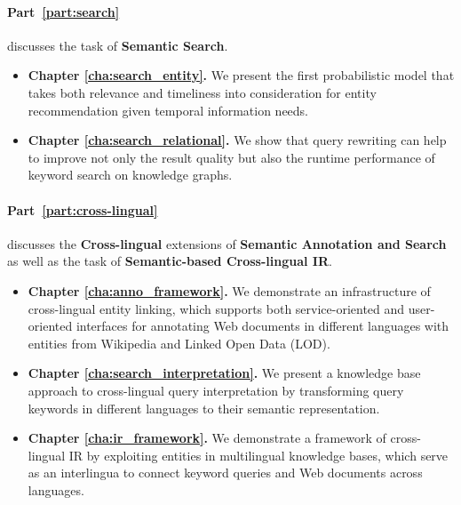 \paragraph{\textbf{Part~\ref{part:search}}} discusses the task of \textbf{Semantic Search}.

\begin{itemize}
\item \textbf{Chapter \ref{cha:search_entity}.} We present the first probabilistic model that takes both relevance and timeliness into consideration for entity recommendation given temporal information needs.
\item \textbf{Chapter \ref{cha:search_relational}.} We show that query rewriting can help to improve not only the result quality but also the runtime performance of keyword search on knowledge graphs.
\end{itemize}

\paragraph{\textbf{Part~\ref{part:cross-lingual}}} discusses the \textbf{Cross-lingual} extensions of \textbf{Semantic Annotation and Search} as well as the task of \textbf{Semantic-based Cross-lingual IR}.

\begin{itemize}
\item \textbf{Chapter \ref{cha:anno_framework}.} We demonstrate an infrastructure of cross-lingual entity linking, which supports both service-oriented and user-oriented interfaces for annotating Web documents in different languages with entities from Wikipedia and Linked Open Data (LOD).
\item \textbf{Chapter \ref{cha:search_interpretation}.} We present a knowledge base approach to cross-lingual query interpretation by transforming query keywords in different languages to their semantic representation.
\end{itemize}


\begin{itemize}
\item \textbf{Chapter \ref{cha:ir_framework}.} We demonstrate a framework of cross-lingual IR by exploiting entities in multilingual knowledge bases, which serve as an interlingua to connect keyword queries and Web documents across languages.
\end{itemize}

